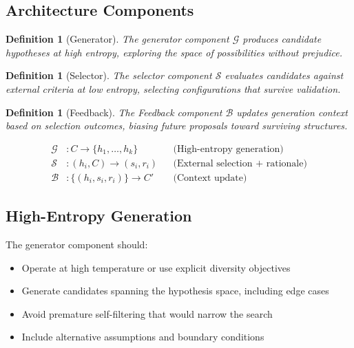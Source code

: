 \documentclass[11pt]{article}
\newtheorem{definition}[theorem]{Definition}
\begin{document}
\subsection{Architecture Components}

\begin{definition}[Generator]
The generator component $\mathcal{G}$ produces candidate hypotheses at high entropy,
exploring the space of possibilities without prejudice.
\end{definition}

\begin{definition}[Selector]
The selector component $\mathcal{S}$ evaluates candidates against external criteria at low
entropy, selecting configurations that survive validation.
\end{definition}

\begin{definition}[Feedback]
The Feedback component $\mathcal{B}$ updates generation context based on selection outcomes,
biasing future proposals toward surviving structures.
\end{definition}

\begin{equation}
\boxed{
\begin{aligned}
\mathcal{G}&: C \to \{h_1, \ldots, h_k\} && \text{(High-entropy generation)} \\
\mathcal{S}&: (h_i, C) \to (s_i, r_i) && \text{(External selection + rationale)} \\
\mathcal{B}&: \{(h_i, s_i, r_i)\} \to C' && \text{(Context update)}
\end{aligned}
}
\end{equation}

\subsection{High-Entropy Generation}

The generator component should:
\begin{itemize}
    \item Operate at high temperature or use explicit diversity objectives
    \item Generate candidates spanning the hypothesis space, including edge cases
    \item Avoid premature self-filtering that would narrow the search
    \item Include alternative assumptions and boundary conditions
\end{itemize}
\end{document}
